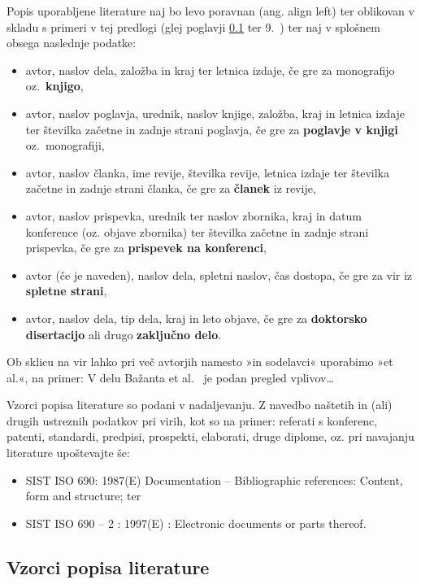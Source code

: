 Popis uporabljene literature naj bo levo poravnan (ang. align left) ter oblikovan v skladu s primeri v tej predlogi (glej poglavji \ref{sec:vzorci_lit}  ter 9.\ \refname{}) ter naj v splošnem obsega naslednje podatke:
\begin{itemize}
	\item avtor, naslov dela, založba in kraj ter letnica izdaje, če gre za monografijo oz.\ \textbf{knjigo},
	\item avtor, naslov poglavja, urednik, naslov knjige, založba, kraj in letnica izdaje ter številka začetne in zadnje strani poglavja, če gre za \textbf{poglavje v knjigi} oz.\ monografiji,
	\item avtor, naslov članka, ime revije, številka revije, letnica izdaje ter številka začetne in zadnje strani članka, če gre za \textbf{članek} iz revije,
	\item avtor, naslov prispevka, urednik ter naslov zbornika, kraj in datum konference (oz. objave zbornika) ter številka začetne in zadnje strani prispevka, če gre za \textbf{prispevek na konferenci},
	\item avtor (če je naveden), naslov dela, spletni naslov, čas dostopa, če gre za vir iz \textbf{spletne strani},
	\item avtor, naslov dela, tip dela, kraj in leto objave, če gre za \textbf{doktorsko disertacijo} ali drugo \textbf{zaključno delo}.
\end{itemize}

Ob sklicu na vir lahko pri več avtorjih namesto »in sodelavci« uporabimo »et al.«, na primer: V delu Bažanta et al.\ \cite{bazant_1991} je podan pregled vplivov\ldots

Vzorci popisa literature so podani v nadaljevanju. Z navedbo naštetih in (ali) drugih ustreznih podatkov pri virih, kot so na primer: referati s konferenc, patenti, standardi, predpisi, prospekti, elaborati, druge diplome, oz. pri navajanju literature upoštevajte še:
\begin{itemize}
	\item SIST ISO 690: 1987(E) Documentation – Bibliographic references: Content, form and structure; ter
	\item SIST ISO 690 – 2 : 1997(E) : Electronic documents or parts thereof.
\end{itemize}


\subsection{Vzorci popisa literature}\label{sec:vzorci_lit}

